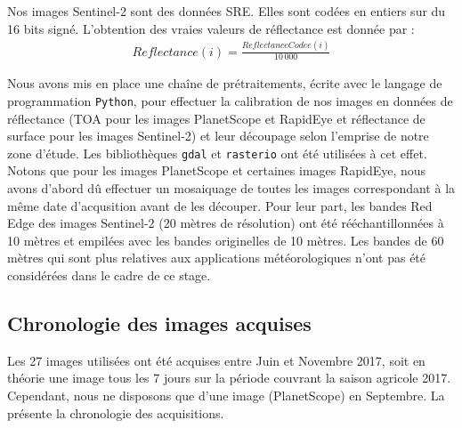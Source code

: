 \vspace{5mm}

Nos images Sentinel-2 sont des données SRE. Elles sont codées en entiers sur du 16 bits signé. L'obtention des vraies valeurs de réflectance est donnée par :
\begin{align}
  Reflectance (i) =  \frac{ReflectanceCodee(i)}{10\,000}
\end{align}

\vspace{5mm}
 
Nous avons mis en place une chaîne de prétraitements, écrite avec le langage de programmation \texttt{Python}, pour effectuer la calibration de nos images en données de 
réflectance (TOA pour les images PlanetScope et RapidEye et réflectance de surface pour les images Sentinel-2) et leur découpage selon l'emprise de notre zone d'étude. 
Les bibliothèques \texttt{gdal} et \texttt{rasterio} ont été utilisées à cet effet. Notons que pour les images PlanetScope et certaines images RapidEye, nous avons d'abord dû 
effectuer un mosaiquage de toutes les images correspondant à la même date d'acqusition avant de les découper. Pour leur part, les bandes Red Edge des images Sentinel-2 (20 mètres 
de résolution) ont été rééchantillonnées à 10 mètres et empilées avec les bandes originelles de 10 mètres. Les bandes de 60 mètres qui sont plus relatives aux applications 
météorologiques n'ont pas été considérées dans le cadre de ce stage.

  \subsection{Chronologie des images acquises}
  
Les 27 images utilisées ont été acquises entre Juin et Novembre 2017, soit en théorie une image tous les 7 jours sur la période couvrant la saison agricole 2017. Cependant, nous ne disposons que d'une image (PlanetScope) en Septembre. La  présente la chronologie des acquisitions.

